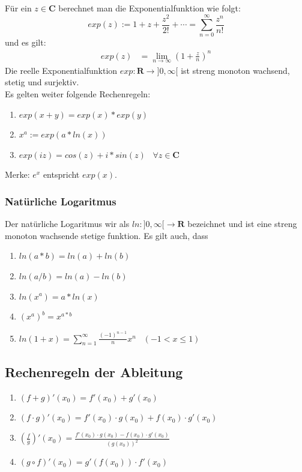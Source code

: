 \documentclass[8pt]{extarticle}
\begin{document}
\begin{multicols*}{3}
  Für ein $z \in \mathbf{C}$ berechnet man die Exponentialfunktion wie folgt:
  $$
    exp(z) := 1 + z + \frac{z^2}{2!} + \cdots = \sum_{n = 0}^\infty \frac{z^n}{n!}
  $$
  und es gilt:
  \begin{align*}
    exp(z) & = \lim_{n \rightarrow \infty} (1 + \frac{z}{n})^n
  \end{align*}
  Die reelle Exponentialfunktion $exp: \mathbf{R} \rightarrow ]0, \infty[$ ist streng monoton wachsend,
        stetig und surjektiv.\\
        Es gelten weiter folgende Rechenregeln:
        \begin{enumerate}[label=(\arabic*)]
          \item $exp(x + y) = exp(x) * exp(y)$
          \item $x^a := exp(a * ln(x))$
          \item $exp(iz) = cos(z) + i*sin(z) \;\;\; \forall z \in \mathbf{C}$
        \end{enumerate}
        Merke: $e^x$ entspricht $exp(x)$.
      
          \subsubsection {Natürliche Logaritmus}
        
        Der natürliche Logaritmus wir als $ln: ]0, \infty[ \rightarrow \mathbf{R}$ bezeichnet
  und ist eine streng monoton wachsende stetige funktion. Es gilt auch, dass
  \begin{enumerate}[label=(\arabic*)]
    \item $ln(a * b) = ln(a) + ln(b)$
    \item $ln(a / b) = ln(a) - ln(b)$
    \item $ln(x^a) = a * ln(x)$
    \item $(x^a)^b = x^{a * b}$
    \item $ln(1+x) = \sum_{n=1}^{\infty} \frac{(-1)^{n-1}}{n} x^n \;\;\; (-1 < x \leq 1)$
  \end{enumerate}
  \subsection{Rechenregeln der Ableitung}
  \begin{enumerate}[label=(\arabic*)]
    \item $(f + g)'(x_0) = f'(x_0) + g'(x_0)$
    \item $(f \cdot g)'(x_0) = f'(x_0) \cdot g(x_0) + f(x_0) \cdot g'(x_0)$
    \item $(\frac{f}{g})'(x_0) = \frac{f'(x_0) \cdot g(x_0) - f(x_0) \cdot g'(x_0)}{(g(x_0))^2}$
    \item $(g \circ f)'(x_0) = g'(f(x_0)) \cdot f'(x_0)$
  \end{enumerate}


\end{multicols*}
\end{document}
